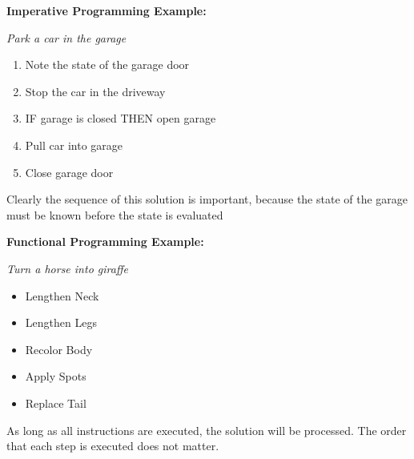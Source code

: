 \documentclass{article}
\begin{document}
        \begin{paracol}{2}
        
            \switchcolumn
            \textbf{Imperative Programming Example: }
            
            \medskip 
            \textit{Park a car in the garage}
            
            \medskip
            \begin{enumerate}
                \item Note the state of the garage door
                \item Stop the car in the driveway
                \item IF garage is closed THEN open garage
                \item Pull car into garage
                \item Close garage door
            \end{enumerate}
            Clearly the sequence of this solution is important, because the state of the garage must be known before the state is evaluated
        
             \switchcolumn
             \textbf{Functional Programming Example: }
             
             \medskip
             \textit{Turn a horse into giraffe}
             
             \medskip
            \begin{itemize}
              \item Lengthen Neck
              \item Lengthen Legs
              \item Recolor Body
              \item Apply Spots
              \item Replace Tail
            \end{itemize}
            As long as all instructions are executed, the solution will be processed. The order that each step is executed does not matter.
        
        \end{paracol}
        
\end{document}
